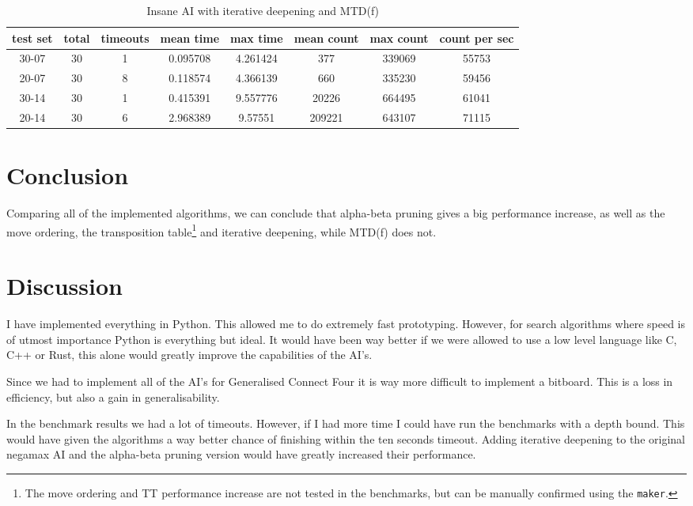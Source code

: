 \documentclass[a4paper]{article}
\begin{document}
\begin{table}[h]
	\centering
	\begin{adjustbox}{center}
	\begin{tabular}{|c|c|c|c|c|c|c|c|}\hline
	\textbf{test set} & \textbf{total} & \textbf{timeouts} & \textbf{mean time} & \textbf{max time} & \textbf{mean count} & \textbf{max count} & \textbf{count per sec} \\\hline
	30-07 & 30 & 1 & 0.095708 & 4.261424 & 377 & 339069 & 55753 \\\hline
	20-07 & 30 & 8 & 0.118574 & 4.366139 & 660 & 335230 & 59456 \\\hline
	30-14 & 30 & 1 & 0.415391 & 9.557776 & 20226 & 664495 & 61041 \\\hline
	20-14 & 30 & 6 & 2.968389 & 9.57551 & 209221 & 643107 & 71115 \\\hline
	\end{tabular}
	\end{adjustbox}
	\caption{Insane AI with iterative deepening and MTD(f)}
	\label{tab: bench insane iter mtdf}
\end{table}

\section{Conclusion}
Comparing all of the implemented algorithms, we can conclude that alpha-beta
pruning gives a big performance increase, as well as the move ordering, the
transposition table\footnote{The move ordering and TT performance increase are
not tested in the benchmarks, but can be manually confirmed using the
\texttt{maker}.} and iterative deepening, while MTD(f) does not.

\section{Discussion}
I have implemented everything in Python. This allowed me to do extremely fast
prototyping. However, for search algorithms where speed is of utmost importance
Python is everything but ideal. It would have been way better if we were
allowed to use a low level language like C, C++ or Rust, this alone would
greatly improve the capabilities of the AI's.

Since we had to implement all of the AI's for Generalised Connect Four it is
way more difficult to implement a bitboard. This is a loss in efficiency, but
also a gain in generalisability.

In the benchmark results we had a lot of timeouts. However, if I had more time
I could have run the benchmarks with a depth bound. This would have given the
algorithms a way better chance of finishing within the ten seconds timeout.
Adding iterative deepening to the original negamax AI and the alpha-beta
pruning version would have greatly increased their performance.
\end{document}
